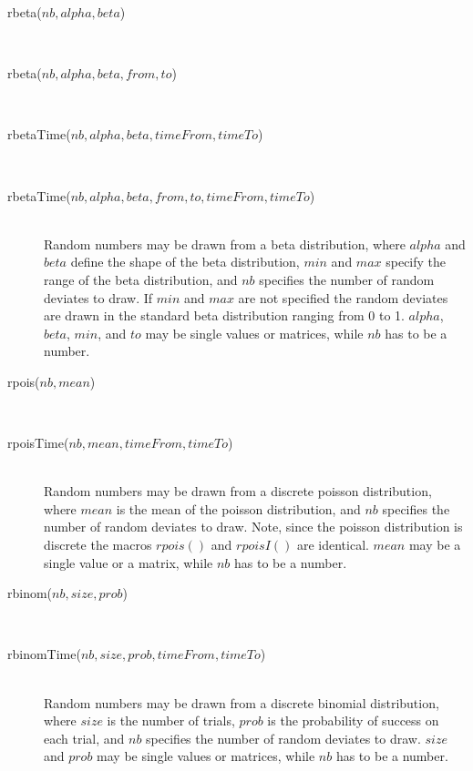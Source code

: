 \documentclass[letterpaper,12pt,oneside]{book}
\begin{document}
\begin{description}
\item[rbeta($nb, alpha, beta$)]\hspace*{\fill}\\
\vspace{-9mm}
\item[rbeta($nb, alpha, beta, from, to$)]\hspace*{\fill}\\
\vspace{-9mm}
\item[rbetaTime($nb, alpha, beta, timeFrom, timeTo$)]\hspace*{\fill}\\
\vspace{-9mm}
\item[rbetaTime($nb, alpha, beta, from, to, timeFrom, timeTo$)]\hspace*{\fill}\\
Random numbers may be drawn from a beta distribution, where $alpha$ and $beta$ define the shape of the beta distribution, $min$ and $max$ specify the range of the beta distribution, and $nb$ specifies the number of random deviates to draw. If $min$ and $max$ are not specified the random deviates are drawn in the standard beta distribution ranging from 0 to 1. $alpha$, $beta$, $min$, and $to$ may be single values or matrices, while $nb$ has to be a number.

\item[rpois($nb, mean$)]\hspace*{\fill}\\
\vspace{-9mm}
\item[rpoisTime($nb, mean, timeFrom, timeTo$)]\hspace*{\fill}\\
Random numbers may be drawn from a discrete poisson distribution, where $mean$ is the mean of the poisson distribution, and $nb$ specifies the number of random deviates to draw. Note, since the poisson distribution is discrete the macros $rpois()$ and $rpoisI()$ are identical. $mean$ may be a single value or a matrix, while $nb$ has to be a number.

\item[rbinom($nb, size, prob$)]\hspace*{\fill}\\
\vspace{-9mm}
\item[rbinomTime($nb, size, prob, timeFrom, timeTo$)]\hspace*{\fill}\\
Random numbers may be drawn from a discrete binomial distribution, where $size$ is the number of trials, $prob$ is the probability of success on each trial, and $nb$ specifies the number of random deviates to draw. $size$ and $prob$ may be single values or matrices, while $nb$ has to be a number.


\end{description}
\end{document}
